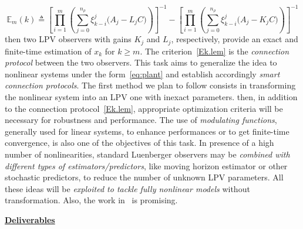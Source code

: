 \documentclass[a4paper,11pt]{article}
\begin{document}
\begin{itemize}[leftmargin=.2in,noitemsep,nolistsep]
{
\scriptsize
\begin{equation}\label{Ek.lem}
\mathbb{E}_m(k) \triangleq \left [ \prod^{m}_{i=1} \left( \sum^{n_\rho}_{j=0}\xi^{j}_{k-i}\big( A_j-L_j C\big)\right) \right ]^{-1}
- \left [ \prod^{m}_{i=1} \left( \sum^{n_\rho}_{j=0}\xi^{j}_{k-i}\big( A_j-K_j C\big)\right) \right ]^{-1}
\end{equation}
}
then two LPV observers with gains $K_j$ and $L_j$, respectively, provide an exact and finite-time estimation of $x_k$ for $k\geq m$. The criterion~\eqref{Ek.lem} is the {\it connection protocol} between the two observers. This task aims to generalize the idea to nonlinear systems under the form~\eqref{eq:plant} and establish accordingly {\it smart connection protocols}. The first method we plan to follow consists in transforming the nonlinear system into an LPV one with inexact parameters. then, in addition to the connection protocol~\eqref{Ek.lem}, appropriate optimization criteria will be necessary for robustness and performance. The use of {\it modulating functions}, generally used for linear systems, to enhance performances or to get finite-time convergence, is also one of the objectives of this task. In presence of a high number of nonlinearities, standard Luenberger observers may be {\it combined with different types of estimators/predictors}, like moving horizon estimator or other stochastic predictors, to reduce the number of unknown LPV parameters. All these ideas will be {\it exploited to tackle fully nonlinear models} without transformation. Also, the work in~\cite{bako2019interval} is promising.

%
%



\begin{tcolorbox}[breakable, enhanced,  colback=yellow!2!white,
title = \bf Deliverables$-$Risks and Fallback Solutions, coltitle= black, colbacktitle=yellow!7!white, halign title=center]

{ \bf \underline{Deliverables}}


\end{tcolorbox}
\end{itemize}
\end{document}
